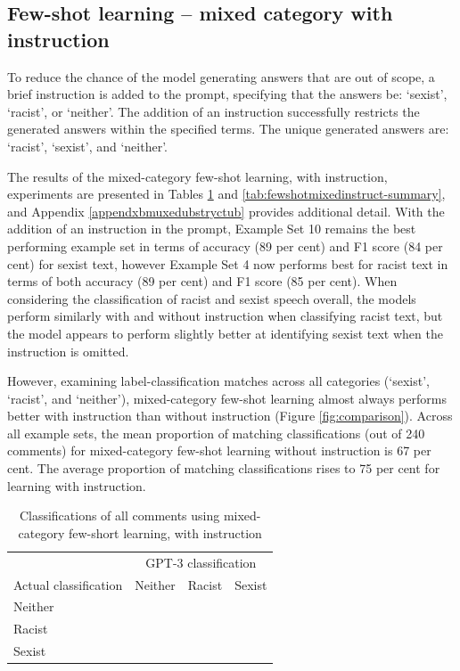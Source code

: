 \documentclass[12pt,]{article}
\begin{document}
\hypertarget{few-shot-learning-mixed-category-with-instruction}{%
\subsection{Few-shot learning -- mixed category with instruction}\label{few-shot-learning-mixed-category-with-instruction}}

To reduce the chance of the model generating answers that are out of scope, a brief instruction is added to the prompt, specifying that the answers be: `sexist', `racist', or `neither'. The addition of an instruction successfully restricts the generated answers within the specified terms. The unique generated answers are: `racist', `sexist', and `neither'.

The results of the mixed-category few-shot learning, with instruction, experiments are presented in Tables \ref{tab:fewshotmixedinstruct-matrix} and \ref{tab:fewshotmixedinstruct-summary}, and Appendix \ref{appendxbmuxedubstryctub} provides additional detail. With the addition of an instruction in the prompt, Example Set 10 remains the best performing example set in terms of accuracy (89 per cent) and F1 score (84 per cent) for sexist text, however Example Set 4 now performs best for racist text in terms of both accuracy (89 per cent) and F1 score (85 per cent). When considering the classification of racist and sexist speech overall, the models perform similarly with and without instruction when classifying racist text, but the model appears to perform slightly better at identifying sexist text when the instruction is omitted.

However, examining label-classification matches across all categories (`sexist', `racist', and `neither'), mixed-category few-shot learning almost always performs better with instruction than without instruction (Figure \ref{fig:comparison}). Across all example sets, the mean proportion of matching classifications (out of 240 comments) for mixed-category few-shot learning without instruction is 67 per cent. The average proportion of matching classifications rises to 75 per cent for learning with instruction.

\begin{table}

\caption{\label{tab:fewshotmixedinstruct-matrix}Classifications of all comments using mixed-category few-short learning, with instruction}
\centering
\begin{tabular}[t]{llll}
\toprule
\multicolumn{1}{c}{ } & \multicolumn{3}{c}{GPT-3 classification} \\
\cmidrule(l{3pt}r{3pt}){2-4}
Actual classification & Neither & Racist & Sexist\\
\midrule
Neither & \cellcolor[HTML]{AED581}{984} & \cellcolor[HTML]{FFFFFF}{163} & \cellcolor[HTML]{FFFFFF}{53}\\
Racist & \cellcolor[HTML]{FFFFFF}{98} & \cellcolor[HTML]{AED581}{500} & \cellcolor[HTML]{FFFFFF}{2}\\
Sexist & \cellcolor[HTML]{FFFFFF}{264} & \cellcolor{white}{35} & \cellcolor[HTML]{AED581}{301}\\
\bottomrule
\end{tabular}
\end{table}
\end{document}
